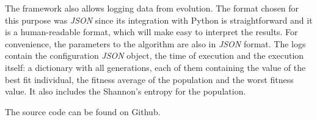 The framework also allows logging data from evolution. The format chosen for this purpose was \textit{JSON} since its integration with Python is straightforward and it is a human-readable format, which will make easy to interpret the results. For convenience, the parameters to the algorithm are also in \textit{JSON} format. The logs contain the configuration \textit{JSON} object, the time of execution and the execution itself: a dictionary with all generations, each of them containing the value of the best fit individual, the fitness average of the population and the worst fitness value. It also includes the Shannon's entropy for the population. 

The source code can be found on Github\cite{ab-level}.


